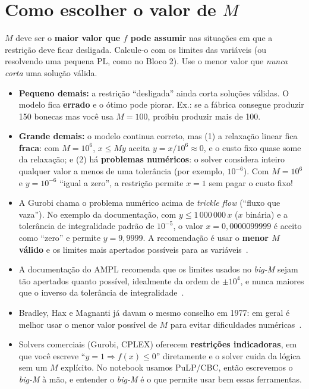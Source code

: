 \section{Como escolher o valor de $M$}
\label{sec:escolherM}

\begin{receita}
$M$ deve ser o \textbf{maior valor que $f$ pode assumir} nas situações em que a restrição deve ficar desligada.
Calcule-o com os limites das variáveis (ou resolvendo uma pequena PL, como no Bloco 2). Use o menor valor que
\emph{nunca corta} uma solução válida.
\end{receita}

\begin{atencao}
\begin{itemize}
  \item \textbf{Pequeno demais:} a restrição ``desligada'' ainda corta soluções válidas. O modelo fica
  \textbf{errado} e o ótimo pode piorar. Ex.: se a fábrica consegue produzir 150 bonecas mas você usa $M=100$,
  proibiu produzir mais de 100.
  \item \textbf{Grande demais:} o modelo continua correto, mas (1) a relaxação linear fica \textbf{fraca}: com
  $M=10^6$, $x\le My$ aceita $y=x/10^6\approx 0$, e o custo fixo quase some da relaxação; e (2) há
  \textbf{problemas numéricos}: o solver considera inteiro qualquer valor a menos de uma tolerância (por exemplo,
  $10^{-6}$). Com $M=10^6$ e $y=10^{-6}$ ``igual a zero'', a restrição permite $x=1$ sem pagar o custo fixo!
\end{itemize}
\end{atencao}

\begin{outros}
\begin{itemize}
  \item A Gurobi chama o problema numérico acima de \emph{trickle flow} (``fluxo que vaza''). No exemplo da
  documentação, com $y\le1\,000\,000\,x$ ($x$ binária) e a tolerância de integralidade padrão de $10^{-5}$, o valor
  $x=0{,}0000099999$ é aceito como ``zero'' e permite $y=9{,}9999$. A recomendação é usar o \textbf{menor $M$
  válido} e os limites mais apertados possíveis para as variáveis~\cite{gurobitrickle,gurobibigm}.
  \item A documentação do AMPL recomenda que os limites usados no \emph{big-M} sejam tão apertados quanto possível,
  idealmente da ordem de $\pm10^4$, e nunca maiores que o inverso da tolerância de integralidade~\cite{amplnum}.
  \item Bradley, Hax e Magnanti já davam o mesmo conselho em 1977: em geral é melhor usar o menor valor possível
  de $M$ para evitar dificuldades numéricas~\cite[Seç.~9.2]{amp}.
  \item Solvers comerciais (Gurobi, CPLEX) oferecem \textbf{restrições indicadoras}, em que você escreve
  ``$y=1\Rightarrow f(x)\le0$'' diretamente e o solver cuida da lógica sem um $M$ explícito. No notebook usamos
  PuLP/CBC, então escrevemos o \emph{big-M} à mão, e entender o \emph{big-M} é o que permite usar bem essas
  ferramentas.
\end{itemize}
\end{outros}

